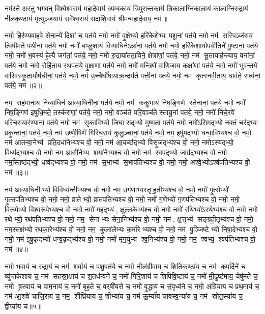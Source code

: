  
\lbrack नम॑स्ते अस्तु भगवन् विश्वेश्व॒राय॑ महादे॒वाय॑ त्र्यम्ब॒काय॑ त्रिपुरान्त॒काय॑ त्रिका\lbrack ला\rbrack ग्निका॒लाय॑ कालाग्निरु॒द्राय॑ नीलक॒ण्ठाय॑ मृत्युञ्ज॒याय॑ सर्वेश्व॒राय॑ सदाशि॒वाय॑ श्रीमन्महादे॒वाय॒ नम॑॥\rbrack

नमो॒ हिर॑ण्यबाहवे सेना॒न्ये॑ दि॒शां च॒ पत॑ये॒ नमो॒ नमो॑ वृ॒क्षेभ्यो॒ हरि॑केशेभ्यः पशू॒नां पत॑ये॒ नमो॒ नम॑ स॒स्पिञ्ज॑राय॒ त्विषी॑मते पथी॒नां पत॑ये॒ नमो॒ नमो॑ बभ्लु॒शाय॑ विव्या॒धिने\-ऽन्ना॑नां॒ पत॑ये॒ नमो॒ नमो॒ हरि॑केशायोपवी॒तिने॑ पु॒ष्टानां॒ पत॑ये॒ नमो॒ नमो॑ भ॒वस्य॑ हे॒त्यै जग॑तां॒ पत॑ये॒ नमो॒ नमो॑ रु॒द्राया॑तता॒विने॒ क्षेत्रा॑णां॒ पत॑ये॒ नमो॒ नम॑ सू॒तायाह॑न्त्याय॒ वना॑नां॒ पत॑ये॒ नमो॒ नमो॒ रोहि॑ताय स्थ॒पत॑ये वृ॒क्षाणां॒ पत॑ये॒ नमो॒ नमो॑ म॒न्त्रिणे॑ वाणि॒जाय॒ कक्षा॑णां॒ पत॑ये॒ नमो॒ नमो॑ भुव॒न्तये॑ वारिवस्कृ॒तायौष॑धीनां॒ पत॑ये॒ नमो॒ नम॑ उ॒च्चैर्घो॑षा\-याक्र॒न्दय॑ते पत्ती॒नां पत॑ये॒ नमो॒ नम॑ कृत्स्नवी॒ताय॒ धाव॑ते॒ सत्व॑नां॒ पत॑ये॒ नम॑॥२॥ 


नम॒ सह॑मानाय निव्या॒धिन॑ आव्या॒धिनी॑नां॒ पत॑ये॒ नमो॒ नम॑ ककु॒भाय॑ निष॒ङ्गिणे स्ते॒नानां॒ पत॑ये॒ नमो॒ नमो॑ निष॒ङ्गिण॑ इषुधि॒मते॒ तस्क॑राणां॒ पत॑ये॒ नमो॒ नमो॒ वञ्च॑ते परि॒वञ्च॑ते स्तायू॒नां पत॑ये॒ नमो॒ नमो॑ निचे॒रवे॑ परिच॒रायार॑ण्यानां॒ पत॑ये॒ नमो॒ नम॑ सृका॒विभ्यो॒ जिघासद्भ्यो मुष्ण॒तां पत॑ये॒ नमो॒ नमो॑ऽसि॒मद्भ्यो॒ नक्तं॒ चर॑द्भ्यः प्रकृ॒न्तानां॒ पत॑ये॒ नमो॒ नम॑ उष्णी॒षिणे॑ गिरिच॒राय॑ कुलु॒ञ्चानां॒ पत॑ये॒ नमो॒ नम॒ इषु॑मद्भ्यो धन्वा॒विभ्य॑श्च वो॒ नमो॒ नम॑ आतन्वा॒नेभ्य॑ प्रति॒दधा॑नेभ्यश्च वो॒ नमो॒ नम॑ आ॒यच्छ॑द्भ्यो विसृ॒जद्भ्य॑श्च वो॒ नमो॒ नमोऽस्य॑द्भ्यो॒ विध्य॑द्भ्यश्च वो॒ नमो॒ नम॒ आसी॑नेभ्य॒ शया॑नेभ्यश्च वो॒ नमो॒ नम॑ स्व॒पद्भ्यो॒ जाग्र॑द्भ्यश्च वो॒ नमो॒ नम॒स्तिष्ठ॑द्भ्यो॒ धाव॑द्भ्यश्च वो॒ नमो॒ नम॑ स॒भाभ्य॑ स॒भाप॑तिभ्यश्च वो॒ नमो॒ नमो॒ अश्वे॒भ्योऽश्व॑पतिभ्यश्च वो॒ नम॑॥३॥ 

नम॑ आव्या॒धिनीभ्यो वि॒विध्य॑न्तीभ्यश्च वो॒ नमो॒ नम॒ उग॑णाभ्यस्तृ\-ह॒तीभ्य॑श्च वो॒ नमो॒ नमो॑ गृ॒त्सेभ्यो॑ गृ॒त्सप॑तिभ्यश्च वो॒ नमो॒ नमो॒ व्रातेभ्यो॒ व्रात॑पतिभ्यश्च वो॒ नमो॒ नमो॑ ग॒णेभ्यो॑ ग॒णप॑तिभ्यश्च वो॒ नमो॒ नमो॒ विरू॑पेभ्यो वि॒श्वरू॑पेभ्यश्च वो॒ नमो॒ नमो॑ म॒हद्भ्य॑, क्षुल्ल॒केभ्य॑श्च वो॒ नमो॒ नमो॑ र॒थिभ्यो॑ऽर॒थेभ्य॑श्च वो॒ नमो॒ नमो॒ रथेभ्यो॒ रथ॑पतिभ्यश्च वो॒ नमो॒ नम॒ सेनाभ्यः सेना॒निभ्य॑श्च वो॒ नमो॒ नम॑, क्ष॒त्तृभ्य॑ सङ्ग्रही॒तृभ्य॑श्च वो॒ नमो॒ नम॒स्तक्ष॑भ्यो रथका॒रेभ्य॑श्च वो॒ नमो॒ नम॒ कुला॑लेभ्यः क॒र्मारेभ्यश्च वो॒ नमो॒ नम॑ पु॒ञ्जिष्टेभ्यो निषा॒देभ्य॑श्च वो॒ नमो॒ नम॑ इषु॒कृद्भ्यो॑ धन्व॒कृद्भ्य॑श्च वो॒ नमो॒ नमो॑ मृग॒युभ्य॑ श्व॒निभ्य॑श्च वो॒ नमो॒ नम॒ श्वभ्य॒ श्वप॑तिभ्यश्च वो॒ नम॑॥४॥ 

नमो॑ भ॒वाय॑ च रु॒द्राय॑ च॒ नम॑ श॒र्वाय॑ च पशु॒पत॑ये च॒ नमो॒ नील॑ग्रीवाय च शिति॒कण्ठा॑य च॒ नम॑ कप॒र्दिने॑ च॒ व्यु॑प्तकेशाय च॒ नम॑ सहस्रा॒क्षाय॑ च श॒तध॑न्वने च॒ नमो॑ गिरि॒शाय॑ च शिपिवि॒ष्टाय॑ च॒ नमो॑ मी॒ढुष्ट॑माय॒ चेषु॑मते च॒ नमो ह्र॒स्वाय॑ च वाम॒नाय॑ च॒ नमो॑ बृह॒ते च॒ वर्‌षी॑यसे च॒ नमो॑ वृ॒द्धाय॑ च सं॒वृध्व॑ने च॒ नमो॒ अग्रि॑याय च प्रथ॒माय॑ च॒ नम॑ आ॒शवे॑ चाजि॒राय॑ च॒ नम॒ शीघ्रि॑याय च॒ शीभ्या॑य च॒ नम॑ ऊ॒र्म्या॑य चावस्व॒न्या॑य च॒ नम॑ स्रोत॒स्या॑य च॒ द्वीप्या॑य च॥५॥ 

